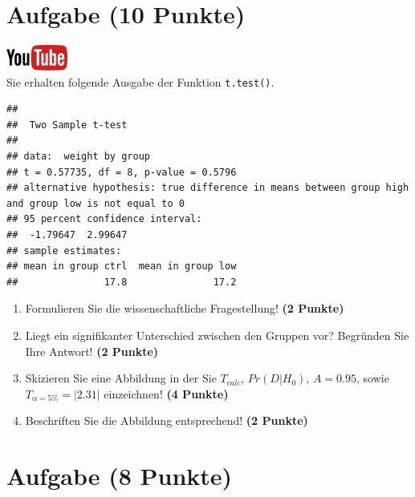 \documentclass[a4paper, 10pt]{scrartcl}\usepackage[]{graphicx}\usepackage[]{xcolor}
\makeatletter
\newenvironment{kframe}{%
 \def\at@end@of@kframe{}%
 \ifinner\ifhmode%
  \def\at@end@of@kframe{\end{minipage}}%
  \begin{minipage}{\columnwidth}%
 \fi\fi%
 \def\FrameCommand##1{\hskip\@totalleftmargin \hskip-\fboxsep
 \colorbox{shadecolor}{##1}\hskip-\fboxsep
     \hskip-\linewidth \hskip-\@totalleftmargin \hskip\columnwidth}%
 \MakeFramed {\advance\hsize-\width
   \@totalleftmargin\z@ \linewidth\hsize
   \@setminipage}}%
 {\par\unskip\endMakeFramed%
 \at@end@of@kframe}
\newenvironment{knitrout}{}{} %
\makeatother
\begin{document}
\section{Aufgabe \hfill (10 Punkte)}

\hfill\href{https://youtu.be/exDo7AyHl4Q}{\includegraphics[width =
  2cm]{img/youtube}}\\[1Ex]

Sie erhalten folgende \Rlogo Ausgabe der Funktion \texttt{t.test()}.

\begin{knitrout}
\color{fgcolor}\begin{kframe}
\begin{verbatim}
## 
## 	Two Sample t-test
## 
## data:  weight by group
## t = 0.57735, df = 8, p-value = 0.5796
## alternative hypothesis: true difference in means between group high and group low is not equal to 0
## 95 percent confidence interval:
##  -1.79647  2.99647
## sample estimates:
## mean in group ctrl  mean in group low 
##               17.8               17.2
\end{verbatim}
\end{kframe}
\end{knitrout}


\begin{enumerate}
  \item Formulieren Sie die wissenschaftliche Fragestellung! \textbf{(2
Punkte)}
\item Liegt ein signifikanter Unterschied zwischen den Gruppen vor?
  Begr{\"u}nden Sie Ihre Antwort! \textbf{(2 Punkte)}
\item Skizieren Sie eine Abbildung in der Sie $T_{calc}$, $Pr(D|H_0)$, $A=0.95$,
  sowie $T_{\alpha=5\%} = |2.31|$ einzeichnen! \textbf{(4 Punkte)}
\item Beschriften Sie die Abbildung entsprechend! \textbf{(2 Punkte)}  
\end{enumerate} 
\clearpage

\section{Aufgabe \hfill (8 Punkte)}
\end{document}
